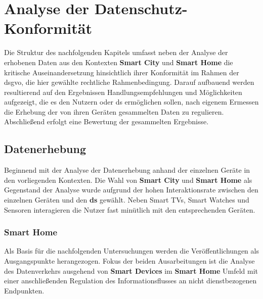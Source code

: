 
\section{Analyse der Datenschutz-Konformität}
\label{sec:Analyse der Datenschutz-Konformität}

Die Struktur des nachfolgenden Kapitels umfasst neben der Analyse der erhobenen Daten aus den Kontexten \textbf{Smart City} und \textbf{Smart Home} die kritische Auseinandersetzung hinsichtlich ihrer Konformität im Rahmen der \ac{dsgvo}, die hier gewählte rechtliche Rahmenbedingung. Darauf aufbauend werden resultierend auf den Ergebnissen Handlungsempfehlungen und Möglichkeiten aufgezeigt, die es den Nutzern oder \ac{ds} ermöglichen sollen, nach eigenem Ermessen die Erhebung der von ihren Geräten gesammelten Daten zu regulieren. Abschließend erfolgt eine Bewertung der gesammelten Ergebnisse.

\subsection{Datenerhebung}
\label{sec:Hauptteil:ssec:Datenerhebung}

Beginnend mit der Analyse der Datenerhebung anhand der einzelnen Geräte in den vorliegenden Kontexten. Die Wahl von \textbf{Smart City} und \textbf{Smart Home} als Gegenstand der Analyse wurde aufgrund der hohen Interaktionsrate zwischen den einzelnen Geräten und den \textbf{ds} gewählt. Neben Smart TVs, Smart Watches und Sensoren interagieren die Nutzer fast minütlich mit den entsprechenden Geräten.

\subsubsection{Smart Home}
\label{sec:Hauptteil:ssec:Datenerhebung:sssec:Smart Home}

Als Basis für die nachfolgenden Untersuchungen werden die Veröffentlichungen  \cite{Mandalari2021,Ren2019} als Ausgangspunkte herangezogen. Fokus der beiden Ausarbeitungen ist die Analyse des Datenverkehrs ausgehend von \textbf{Smart Devices} im \textbf{Smart Home} Umfeld mit einer anschließenden Regulation des Informationsflusses an nicht dienstbezogenen Endpunkten. 


